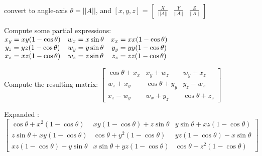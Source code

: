 convert to angle-axis  $ \theta = ||A|| $, and $[x,y,z]$ = $\begin{bmatrix} \frac {X} {||A||} & \frac {Y} {||A||} &  \frac {Z} {||A||} \end{bmatrix} $


Compute some partial expressions:$\begin{matrix}
   x_y = xy(1-\cos \theta) &   w_x = x\sin \theta  &  x_x = xx(1-\cos \theta) \\
   y_z = yz(1-\cos \theta) &    w_y = y\sin \theta &  y_y = yy(1-\cos \theta) \\
   x_z = xz(1-\cos \theta) &    w_z = z\sin \theta &  z_z = zz(1-\cos \theta) 
\end{matrix}\\$


Compute the resulting matrix: $\begin{bmatrix}
\cos \theta+x_x &  x_y + w_z      & w_y + x_z \\
 w_z + x_y      & \cos \theta+y_y & y_z - w_x \\
 x_z - w_y      &  w_x + y_z      & \cos \theta+z_z
\end{bmatrix} $
 

Expanded : $    \begin{bmatrix}
\cos \theta+x^2 (1-\cos \theta)     &   xy(1-\cos \theta) + z\sin \theta & y\sin \theta + xz(1-\cos \theta) \\
 z\sin \theta + xy(1-\cos \theta)   & \cos \theta+y^2 (1-\cos \theta)    & yz(1-\cos \theta) - x\sin \theta \\
xz(1-\cos \theta) - y\sin \theta    &  x\sin \theta + yz(1-\cos \theta)  & \cos \theta+z^{2}(1-\cos \theta)
\end{bmatrix} $




